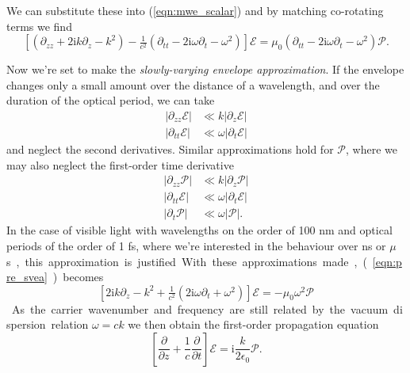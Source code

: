     We can substitute these into (\ref{eqn:mwe_scalar}) and by matching
    co-rotating terms we find
    \begin{equation}
    \left[ ( \partial_{zz} + 2 \mathrm{i} k \partial_{z} - k^2 ) - 
      \tfrac{1}{c^2} (\partial_{tt} - 
      2 \mathrm{i} \omega \partial_{t} - \omega^2 ) \right] \mathcal{E} = 
      \mu_0 (\partial_{tt} - 2 \mathrm{i} \omega \partial_{t} - 
      \omega^2) \mathcal{P}.
    \label{eqn:pre_svea}
    \end{equation}

    Now we're set to make the \textit{slowly-varying envelope
    approximation}.\cite{lambropoulos2007fundamentals} If the envelope changes
    only a small amount over the distance of a wavelength, and over the duration
    of the optical period, we can take
    \begin{align*}
    \lvert \partial_{zz} \mathcal{E} \rvert &\ll k \lvert \partial_{z} 
        \mathcal{E} \rvert\\
    \lvert \partial_{tt} \mathcal{E} \rvert &\ll \omega \lvert \partial_{t} 
        \mathcal{E} \rvert
    \end{align*}
    and neglect the second derivatives. Similar approximations hold for
    $\mathcal{P}$, where we may also neglect the first-order time derivative
    \begin{align*}
      \lvert \partial_{zz} \mathcal{P} \rvert &\ll 
        k \lvert \partial_{z} \mathcal{P} \rvert \\
      \lvert \partial_{tt} \mathcal{E} \rvert &\ll 
        \omega \lvert \partial_{t} \mathcal{E} \rvert \\
      \lvert \partial_{t} \mathcal{P} \rvert &\ll 
        \omega \lvert \mathcal{P} \rvert.
    \end{align*}
    In the case of visible light with wavelengths on the order of 100 nm and
    optical periods of the order of 1 fs, where we're interested in the
    behaviour over \unit{ns} or \unit{$\mu$s}, this approximation is justified.

    With these approximations made, (\ref{eqn:pre_svea}) becomes
    \begin{equation}
      \left[ 2 \mathrm{i} k \partial_z - k^2 + \tfrac{1}{c^2} 
      (2 \mathrm{i} \omega \partial_t + \omega^2 ) \right] \mathcal{E} = 
      -\mu_0 \omega^2 \mathcal{P}
    \end{equation}
    As the carrier wavenumber and frequency are still related by the vacuum
    dispersion relation $\omega = c k$ we then obtain the first-order
    propagation equation
    \begin{equation}\label{eqn:fo_mwe}
      \left[ \frac{\partial}{\partial z} + \frac{1}{c} 
      \frac{\partial}{\partial t} \right] \mathcal{E} = 
      \mathrm{i} \frac{k}{2 \epsilon_0} \mathcal{P}.
    \end{equation}

